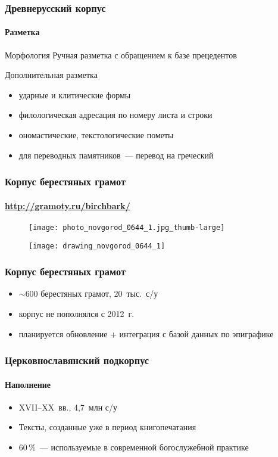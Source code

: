 \begin{frame}
  \frametitle{Древнерусский корпус}
  \framesubtitle{Разметка}

  \begin{block}{Морфология}
    Ручная разметка с обращением к базе прецедентов
  \end{block}

  \begin{block}{Дополнительная разметка}
    \begin{itemize}
      \item ударные и клитические формы
      \item филологическая адресация по номеру листа и строки
      \item ономастические, текстологические пометы
      \item для переводных памятников~--- перевод на греческий
    \end{itemize}
  \end{block}
\end{frame}

\begin{frame}
  \frametitle{Корпус берестяных грамот}
  \framesubtitle{\url{http://gramoty.ru/birchbark/}}

  \centering
  \begin{figure}[b]
    \texttt{[image: photo\_novgorod\_0644\_1.jpg\_thumb-large]}
  \end{figure}

  \begin{figure}[t]
    \texttt{[image: drawing\_novgorod\_0644\_1]}
  \end{figure}
\end{frame}

\begin{frame}
  \frametitle{Корпус берестяных грамот}

  \begin{itemize}
    \item $\sim$600 берестяных грамот, 20~тыс.\ с/у
    \item корпус не пополнялся с 2012~г.
    \item планируется обновление + интеграция с базой данных по эпиграфике
  \end{itemize}

\end{frame}

\begin{frame}
  \frametitle{Церковнославянский подкорпус}
  \framesubtitle{Наполнение}

  \begin{itemize}
    \item XVII--XX~вв., 4,7~млн с/у
    \item Тексты, созданные уже в период книгопечатания
    \item 60\,\%~--- используемые в современной богослужебной практике
  \end{itemize}

\end{frame}

